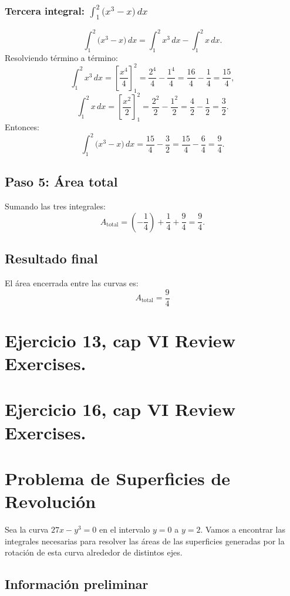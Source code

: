 \documentclass[11pt,letterpaper]{article}
\begin{document}
\subsubsection*{Tercera integral: \( \int_1^2 \big(x^3 - x\big) \, dx \)}
\[
\int_1^2 \big(x^3 - x\big) \, dx = \int_1^2 x^3 \, dx - \int_1^2 x \, dx.
\]
Resolviendo término a término:
\[
\int_1^2 x^3 \, dx = \left[\frac{x^4}{4}\right]_1^2 = \frac{2^4}{4} - \frac{1^4}{4} = \frac{16}{4} - \frac{1}{4} = \frac{15}{4},
\]
\[
\int_1^2 x \, dx = \left[\frac{x^2}{2}\right]_1^2 = \frac{2^2}{2} - \frac{1^2}{2} = \frac{4}{2} - \frac{1}{2} = \frac{3}{2}.
\]
Entonces:
\[
\int_1^2 \big(x^3 - x\big) \, dx = \frac{15}{4} - \frac{3}{2} = \frac{15}{4} - \frac{6}{4} = \frac{9}{4}.
\]

\subsection*{Paso 5: Área total}
Sumando las tres integrales:
\[
A_{\text{total}} = \left(-\frac{1}{4}\right) + \frac{1}{4} + \frac{9}{4} = \frac{9}{4}.
\]

\subsection*{Resultado final}
El área encerrada entre las curvas es:
\[
\boxed{A_{\text{total}} = \frac{9}{4}}
\]

\section{Ejercicio 13, cap VI Review Exercises.}

\section{Ejercicio 16, cap VI Review Exercises.}
\section*{Problema de Superficies de Revolución}

Sea la curva \( 27x - y^3 = 0 \) en el intervalo \( y = 0 \) a \( y = 2 \). Vamos a encontrar las integrales necesarias para resolver las áreas de las superficies generadas por la rotación de esta curva alrededor de distintos ejes.

\subsection*{Información preliminar}
\end{document}
